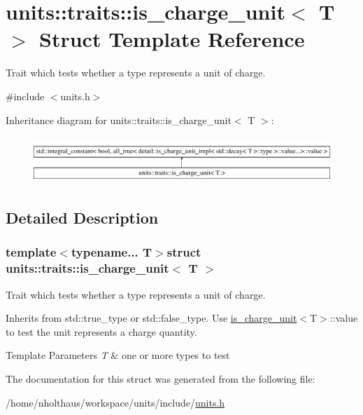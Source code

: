 \hypertarget{structunits_1_1traits_1_1is__charge__unit}{}\section{units\+:\+:traits\+:\+:is\+\_\+charge\+\_\+unit$<$ T $>$ Struct Template Reference}
\label{structunits_1_1traits_1_1is__charge__unit}


Trait which tests whether a type represents a unit of charge.  




{\ttfamily \#include $<$units.\+h$>$}

Inheritance diagram for units\+:\+:traits\+:\+:is\+\_\+charge\+\_\+unit$<$ T $>$\+:\begin{figure}[H]
\begin{center}
\leavevmode
\includegraphics[height=1.772152cm]{structunits_1_1traits_1_1is__charge__unit}
\end{center}
\end{figure}


\subsection{Detailed Description}
\subsubsection*{template$<$typename... T$>$struct units\+::traits\+::is\+\_\+charge\+\_\+unit$<$ T $>$}

Trait which tests whether a type represents a unit of charge. 

Inherits from {\ttfamily std\+::true\+\_\+type} or {\ttfamily std\+::false\+\_\+type}. Use {\ttfamily \hyperlink{structunits_1_1traits_1_1is__charge__unit}{is\+\_\+charge\+\_\+unit}$<$T$>$\+::value} to test the unit represents a charge quantity. 
\begin{DoxyTemplParams}{Template Parameters}
{\em T} & one or more types to test \\
\hline
\end{DoxyTemplParams}


The documentation for this struct was generated from the following file\+:\begin{DoxyCompactItemize}
\item 
/home/nholthaus/workspace/units/include/\hyperlink{units_8h}{units.\+h}\end{DoxyCompactItemize}
